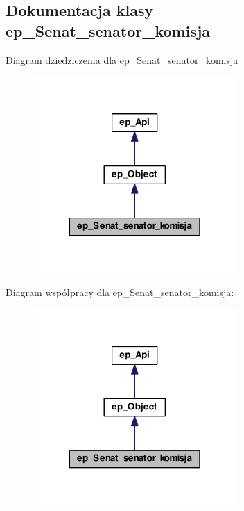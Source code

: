 \hypertarget{classep___senat__senator__komisja}{\subsection{Dokumentacja klasy ep\-\_\-\-Senat\-\_\-senator\-\_\-komisja}
\label{classep___senat__senator__komisja}
}


Diagram dziedziczenia dla ep\-\_\-\-Senat\-\_\-senator\-\_\-komisja\nopagebreak
\begin{figure}[H]
\begin{center}
\leavevmode
\includegraphics[width=220pt]{classep___senat__senator__komisja__inherit__graph}
\end{center}
\end{figure}


Diagram współpracy dla ep\-\_\-\-Senat\-\_\-senator\-\_\-komisja\-:\nopagebreak
\begin{figure}[H]
\begin{center}
\leavevmode
\includegraphics[width=220pt]{classep___senat__senator__komisja__coll__graph}
\end{center}
\end{figure}
